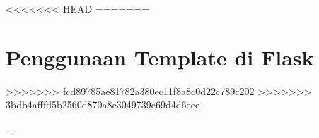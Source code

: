 \documentclass{wileySix}
\begin{document}
%

<<<<<<< HEAD
%
=======
\chapter[Penggunaan Template di Flask]
{Penggunaan Template di Flask}

>>>>>>> fcd89785ae81782a380ec11f8a8c0d22c789c202
>>>>>>> 3bdb4afffd5b2560d870a8c3049739e69d4d6eee





.
.

\printindex
\end{document}
